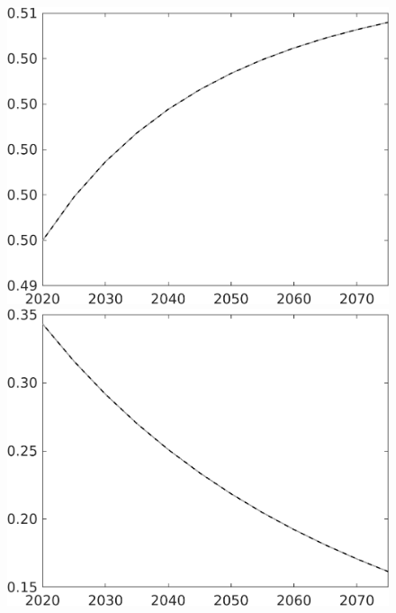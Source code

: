 \documentclass[12pt]{article}
\begin{document}
\begin{figure}
\begin{minipage}[]{0.32\textwidth}
\end{minipage}	
\begin{minipage}[]{0.32\textwidth}
\includegraphics[width=1\textwidth]{../../codding_model/own_basedOnFried/optimalPol_010922_revision/figures/all_13Sept22/CompTaul_Equlab_LFBAU_Reg0_sn_spillover0_nsk1_xgr0_knspil1_sep1_countec0_GovRev0_etaa0.79_lgd0.png}
\end{minipage}	
\begin{minipage}[]{0.32\textwidth}
\includegraphics[width=1\textwidth]{../../codding_model/own_basedOnFried/optimalPol_010922_revision/figures/all_13Sept22/CompTaul_Equlab_LFBAU_Reg0_sff_spillover0_nsk1_xgr0_knspil1_sep1_countec0_GovRev0_etaa0.79_lgd0.png}

\end{minipage}
\end{figure}
\end{document}
